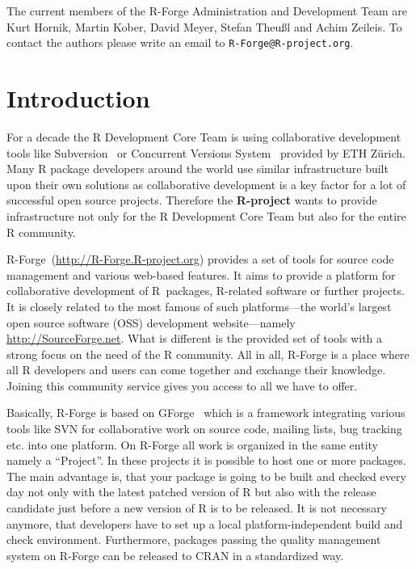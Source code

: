 \documentclass[a4paper]{article}
\newcommand{\RFORGE}{\proglang{R}-Forge Administration and Development Team}
\let\email=\texttt
\newcommand{\proglang}[1]{\textsf{#1}}
\begin{document}
\vspace{0.5cm}
The current members of the \RFORGE{} are Kurt Hornik, Martin Kober,
David Meyer, Stefan Theu\ss{}l and Achim Zeileis. To contact the
authors please write an email to \email{R-Forge@R-project.org}.

\newpage

\pagestyle{plain}
\tableofcontents

\clearpage
\pagestyle{headings}
\setcounter{page}{1}

\section{Introduction}
\label{sec:intro}

For a decade the \proglang{R} Development Core Team is using collaborative
development tools like Subversion~\citep[SVN,
see][]{forge:Pilato+Collins-Sussman+Fitzpatrick:2004} or Concurrent
Versions System~\citep[CVS, see][]{forge:Cederqvist:2006} provided by
ETH Z\"urich.   
Many \proglang{R} package
developers around the world use similar infrastructure built upon their own
solutions as collaborative development is a key factor for a lot of
successful open source projects. Therefore the \textbf{R-project}
wants to provide infrastructure not only
for the \proglang{R} Development Core Team but also for the entire
\proglang{R} community. 

\proglang{R}-Forge~(\url{http://R-Forge.R-project.org}) provides a set of tools
for source code management and various web-based
features. It aims to provide a platform for collaborative development of
\proglang{R}~packages, \proglang{R}-related software or further projects. It is
closely related to the most famous of such platforms---the 
world's largest open source software (OSS) development website---namely
\url{http://SourceForge.net}. What is different is the provided set of
tools with a strong focus on the need of the \proglang{R}
community. All in all, \proglang{R}-Forge is a place where all \proglang{R}
developers and users can come together and exchange 
their knowledge. Joining this community service gives you access to
all we have to offer. 

Basically, \proglang{R}-Forge is based on 
GForge~\citep{forge:copeland_et_al:2006} which is a framework
integrating various tools like 
SVN for collaborative work on source code, mailing lists, bug tracking
etc. into one platform. On \proglang{R}-Forge all work is organized in
the same entity namely a ``Project''. In these projects it is possible
to host one or more packages. The main advantage is, that your package
is going to be built and checked every day 
not only with the latest patched version of \proglang{R} but also with
the release candidate just before a new version of \proglang{R} is to be
released. It is not necessary anymore, that developers have to set up
a local platform-independent build and check environment. Furthermore,
packages passing the quality management system on \proglang{R}-Forge can be
released to CRAN in a standardized way.
\end{document}
